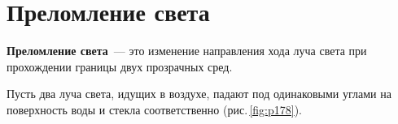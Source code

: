 \documentclass[main.tex]{subfiles}
\begin{document}

 

 

\setcounter{section}{3
}
\addtocounter{section}{-1} 

\section{Преломление света}


\textbf{Преломление света}~--- это изменение направления хода луча света при прохождении границы двух прозрачных сред.

Пусть два луча света, идущих в воздухе, падают под одинаковыми углами на поверхность воды и стекла соответственно (рис.\,\ref{fig:p178}).
\end{document}
